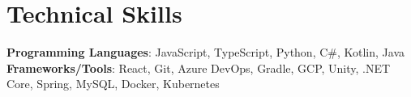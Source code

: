 \section{Technical Skills}
 \begin{itemize}[leftmargin=0.15in, label={}]
    \small{\item{
      \textbf{Programming Languages}{: JavaScript, TypeScript, Python, C\#, Kotlin, Java } \\
     \textbf{Frameworks/Tools}{: React, Git, Azure DevOps, Gradle, GCP, Unity, .NET Core, Spring, MySQL, Docker, Kubernetes }\\
    }}
 \end{itemize}